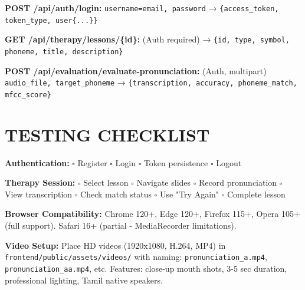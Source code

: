\documentclass[12pt,a4paper]{article}
\begin{document}
\textbf{POST /api/auth/login:} \texttt{username=email, password} → \texttt{\{access\_token, token\_type, user\{...\}\}}

\textbf{GET /api/therapy/lessons/\{id\}:} (Auth required) → \texttt{\{id, type, symbol, phoneme, title, description\}}

\textbf{POST /api/evaluation/evaluate-pronunciation:} (Auth, multipart) \texttt{audio\_file, target\_phoneme} → \texttt{\{transcription, accuracy, phoneme\_match, mfcc\_score\}}

\section{TESTING CHECKLIST}

\textbf{Authentication:} $\square$ Register $\square$ Login $\square$ Token persistence $\square$ Logout

\textbf{Therapy Session:} $\square$ Select lesson $\square$ Navigate slides $\square$ Record pronunciation $\square$ View transcription $\square$ Check match status $\square$ Use "Try Again" $\square$ Complete lesson

\textbf{Browser Compatibility:} Chrome 120+, Edge 120+, Firefox 115+, Opera 105+ (full support). Safari 16+ (partial - MediaRecorder limitations).

\textbf{Video Setup:} Place HD videos (1920x1080, H.264, MP4) in \texttt{frontend/public/assets/videos/} with naming: \texttt{pronunciation\_a.mp4}, \texttt{pronunciation\_aa.mp4}, etc. Features: close-up mouth shots, 3-5 sec duration, professional lighting, Tamil native speakers.
\end{document}
